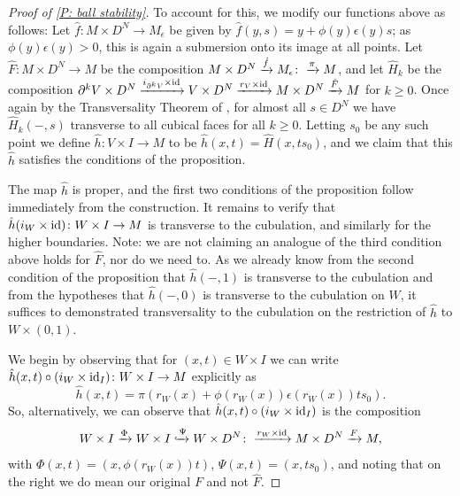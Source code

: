 \begin{proof}[Proof of \cref{P: ball stability}]
To account for this, we modify our functions above as follows: Let $\hat f: M \times D^N \to M_\epsilon$ be given by $\hat f(y, s) = y +\phi(y) \epsilon(y) s$; as $\phi(y)\epsilon(y)>0$, this is again a submersion onto its image at all points. Let $\hat F \colon M \times D^N \to M$ be the composition $M \times D^N \xrightarrow{\hat f}M_\epsilon\colon\xrightarrow{\pi}M$, and let $\hat H_k$ be the composition $\partial^kV \times D^N \xrightarrow{i_{\partial^kV} \times \mathrm{id}}V \times D^N \xrightarrow{r_V \times \mathrm{id}} M \times D^N \xrightarrow{\hat F} M$ for $k\geq 0$. Once again by the Transversality Theorem of \cite[Section 2.3]{GuPo74}, for almost all $s \in D^N$ we have $\hat H_k(-,s)$ transverse to all cubical faces for all $k\geq 0$. Letting $s_0$ be any such point we define $\hat h \colon V \times I \to M$ to be $\hat h(x,t) = \hat H(x,ts_0)$, and we claim that this $\hat h$ satisfies the conditions of the proposition.

The map $\hat h$ is proper, and the first two conditions of the proposition follow immediately from the construction. It remains to verify that $\hat h (i_W \times \mathrm{id}) \colon W \times I \to M$ is transverse to the cubulation, and similarly for the higher boundaries. Note: we are not claiming an analogue of the third condition above holds for $\hat F$, nor do we need to. As we already know from the second condition of the proposition that $\hat h(-,1)$ is transverse to the cubulation and from the hypotheses that $\hat h(-,0)$ is transverse to the cubulation on $W$, it suffices to demonstrated transversality to the cubulation on the restriction of $\hat h$ to $W \times (0,1)$.

We begin by observing that for $(x,t) \in W \times I$ we can write $\hat h(x,t) \circ (i_W \times \mathrm{id}_I) \colon W \times I \to M$ explicitly as
$$\hat h(x,t) = \pi(r_W(x)+\phi(r_W(x))\epsilon(r_W(x))ts_0).$$
So, alternatively, we can observe that $\hat h(x,t) \circ (i_W \times \mathrm{id}_I)$ is the composition
\begin{equation}\label{E: alt hat h}
W \times I \xrightarrow{\Phi} W \times I \xhookrightarrow{\Psi} W \times D^N\colon\xrightarrow{r_W \times \mathrm{id}} M \times D^N \xrightarrow{F} M,
\end{equation}
with $\Phi(x,t) = (x,\phi(r_W(x))t)$, $\Psi(x,t) = (x,ts_0)$, and noting that on the right we do mean our original $F$ and not $\hat F$.


\end{proof}
